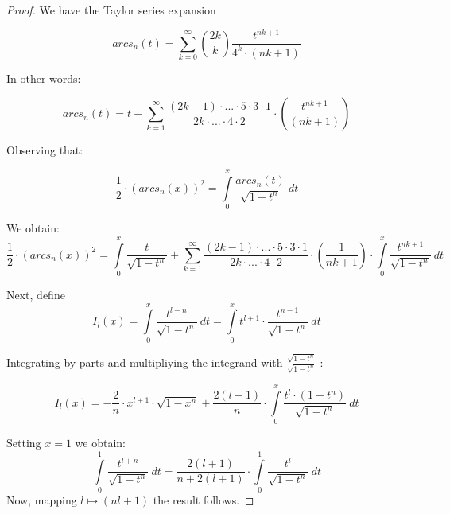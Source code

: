\documentclass[sn-mathphys]{sn-jnl}%
\theoremstyle{thmstyleone}%
\theoremstyle{thmstyletwo}%
\theoremstyle{thmstylethree}%
\begin{document}
\begin{proof}

We have the Taylor series expansion

\begin{equation}
arcs_n(t) = \sum_{k=0}^{\infty} \binom{2k}{k} \frac{t^{nk+1}}{4^{k} \cdot (nk+1)}
\end{equation}

In other words:

\begin{equation}
arcs_n(t) = t + \sum \limits_{k=1}^{\infty} \frac{(2k-1) \cdot ... \cdot 5 \cdot 3 \cdot 1}{2k \cdot ... \cdot 4 \cdot 2} \cdot (\frac{t^{nk+1}}{(nk+1)})
\end{equation}

Observing that:

\begin{equation}
\frac{1}{2} \cdot (arcs_n(x))^2 = \int \limits_{0}^{x} \frac{arcs_n(t)}{\sqrt{1 - t^n}} \ dt
\end{equation}

We obtain: 
\begin{equation}
\frac{1}{2} \cdot (arcs_n(x))^2 =\int \limits_{0}^{x} \frac{t}{\sqrt{1 - t^n}} + \sum \limits_{k=1}^{\infty} \frac{(2k-1) \cdot ... \cdot 5 \cdot 3 \cdot 1}{2k \cdot ... \cdot 4 \cdot 2} \cdot (\frac{1}{nk+1}) \cdot \int \limits_{0}^{x} \frac{t^{nk+1}}{\sqrt{1 - t^n}} \ dt
\end{equation}

Next, define
\begin{equation}
I_l(x) = \int \limits_{0}^{x} \frac{t^{l + n}}{\sqrt{1-t^n}} \ dt = \int \limits_{0}^{x} t^{l + 1} \cdot \frac{t^{n-1}}{\sqrt{1 - t^n}} \ dt
\end{equation}

Integrating by parts and multipliying the integrand with $\frac{\sqrt{1-t^n}}{\sqrt{1-t^n}}$ : 

\begin{equation}
I_l(x) = - \frac{2}{n} \cdot x^{l+1} \cdot \sqrt{1 - x^n} + \frac{2(l+1)}{n} \cdot \int \limits_{0}^{x} \frac{t^{l} \cdot (1 - t^n)}{\sqrt{1-t^n}} \ dt
\end{equation}

Setting $x = 1$ we obtain:
\begin{equation}
\int \limits_{0}^{1} \frac{t^{l+n}}{\sqrt{1-t^n}} \ dt = \frac{2(l+1)}{n+2(l+1)} \cdot \int \limits_{0}^{1} \frac{t^{l}}{\sqrt{1-t^n}} \ dt
\end{equation}
Now, mapping $l \mapsto (nl+1)$ the result follows.

\end{proof}
\end{document}
